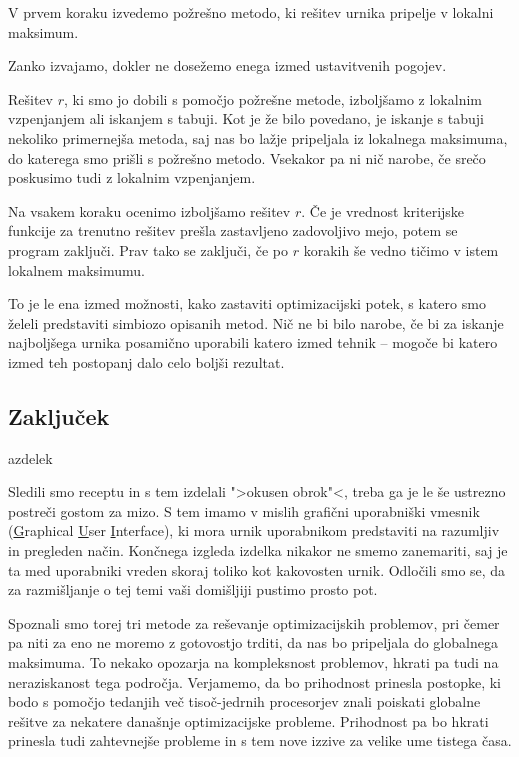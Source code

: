 \documentclass[a4paper,10pt]{article}
\begin{document}
   V prvem koraku izvedemo požrešno metodo, ki rešitev urnika pripelje v lokalni maksimum.

   Zanko izvajamo, dokler ne dosežemo enega izmed ustavitvenih pogojev.

   Rešitev $r$, ki smo jo dobili s pomočjo požrešne metode, izboljšamo z lokalnim vzpenjanjem
   ali iskanjem s tabuji. Kot je že bilo povedano, je iskanje s tabuji nekoliko primernejša metoda,
   saj nas bo lažje pripeljala iz lokalnega maksimuma, do katerega smo prišli s požrešno metodo.
   Vsekakor pa ni nič narobe, če srečo poskusimo tudi z lokalnim vzpenjanjem.

   Na vsakem koraku ocenimo izboljšamo rešitev $r$. Če je vrednost kriterijske funkcije
   za trenutno rešitev prešla zastavljeno zadovoljivo mejo, potem se program zaključi. Prav tako
   se zaključi, če po $r$ korakih še vedno tičimo v istem lokalnem maksimumu.

\noindent
To je le ena izmed možnosti, kako zastaviti optimizacijski potek, s katero smo želeli predstaviti
simbiozo opisanih metod. Nič ne bi bilo narobe, če bi za iskanje najboljšega urnika posamično
uporabili katero izmed tehnik -- mogoče bi katero izmed teh postopanj dalo celo boljši rezultat.

\subsection{Zaključek }azdelek

Sledili smo receptu in s tem izdelali ">okusen obrok"<, treba ga je le še ustrezno postreči
gostom za mizo. S tem imamo v mislih grafični uporabniški vmesnik (\underline{G}raphical
\underline{U}ser \underline{I}nterface), ki mora urnik uporabnikom predstaviti na razumljiv in
pregleden način. Končnega izgleda izdelka nikakor ne smemo zanemariti, saj je ta med uporabniki
vreden skoraj toliko kot kakovosten urnik. Odločili smo se, da za razmišljanje o tej temi vaši
domišljiji pustimo prosto pot.

Spoznali smo torej tri metode za reševanje optimizacijskih problemov, pri čemer pa niti za eno
ne moremo z gotovostjo trditi, da nas bo pripeljala do globalnega maksimuma. To nekako opozarja
na kompleksnost problemov, hkrati pa tudi na neraziskanost tega področja. Verjamemo, da bo
prihodnost prinesla postopke, ki bodo s pomočjo tedanjih več tisoč-jedrnih procesorjev znali
poiskati globalne rešitve za nekatere današnje optimizacijske probleme. Prihodnost pa bo
hkrati prinesla tudi zahtevnejše probleme in s tem nove izzive za velike ume tistega časa.
\end{document}

